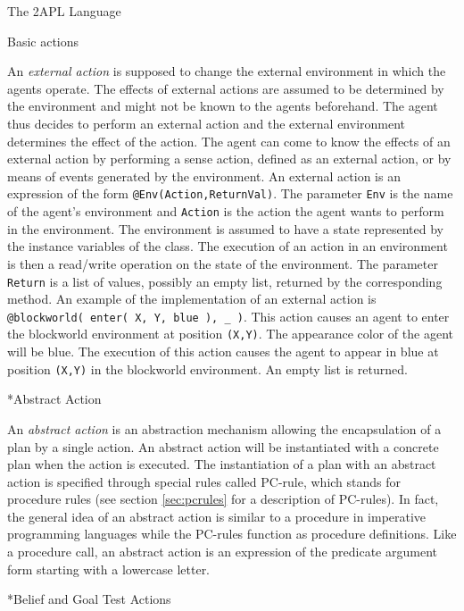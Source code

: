\begin{chapter}{The 2APL Language}
\begin{section}{Basic actions}
\begin{subsection}
An \emph{external action} is supposed to change the external
environment in which the agents operate. The effects of external
actions are assumed to be determined by the environment and might
not be known to the agents beforehand. The agent thus decides to
perform an external action and the external environment determines
the effect of the action. The agent can come to know the effects of
an external action by performing a sense action, defined as an
external action, or by means of events generated by the environment.
An external action  is an expression of the form
{\tt @Env(Action,ReturnVal)}. The parameter {\tt Env} is the name of
the agent's environment and {\tt Action} is the action the agent
wants to perform in the environment. The environment is assumed to
have a state represented by the instance variables of the class. The
execution of an action in an environment is then a read/write
operation on the state of the environment. The parameter {\tt
Return} is a list of values, possibly an empty list, returned by the
corresponding method. An example of the implementation of an
external action is {\tt @blockworld( enter( X, Y, blue ), \_ )}.
This action causes an agent to enter the blockworld environment at
position {\tt (X,Y)}. The appearance color of the agent will be
blue. The execution of this action causes the agent to appear in
blue at position {\tt (X,Y)} in the blockworld environment. An empty
list is returned.
\end{subsection}

\begin{subsection}*{Abstract Action}

An \emph{abstract action} is an abstraction mechanism allowing the
encapsulation of a plan by a single action. An abstract action will
be instantiated with a concrete plan when the action is executed.
The instantiation of a plan with an abstract action is specified
through special rules called PC-rule, which stands for procedure
rules (see section \ref{sec:pcrules} for a description of PC-rules).
In fact, the general idea of an abstract action is similar to a
procedure in imperative programming languages while the PC-rules
function as procedure definitions. Like a procedure call, an
abstract action  is an expression of the
predicate argument form starting with a lowercase letter.
\end{subsection}

\begin{subsection}*{Belief and Goal Test Actions}


\end{subsection}
\end{section}
\end{chapter}
